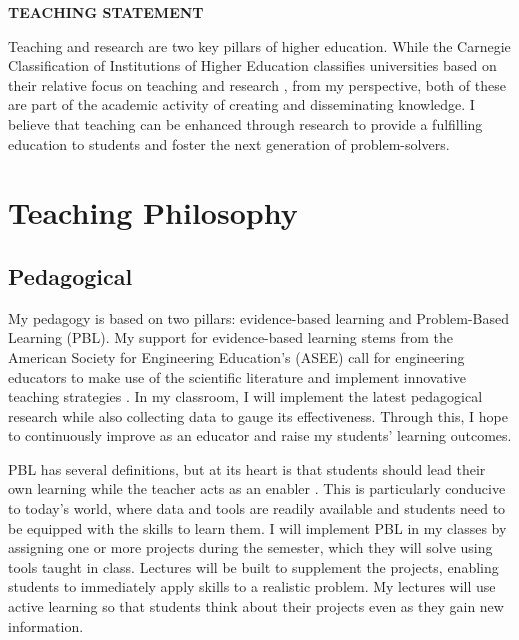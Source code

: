 \documentclass[12pt]{article}
\begin{document}
 \sloppy %
\begin{center}
{\large \uppercase{\textbf{Teaching Statement}}}
\end{center}

Teaching and research are two key pillars of higher education. While the Carnegie Classification of Institutions of Higher Education classifies universities based on their relative focus on teaching and research \cite{carnegie1994classification}, from my perspective, both of these are part of the academic activity of creating and disseminating knowledge. I believe that teaching can be enhanced through research to provide a fulfilling education to students and foster the next generation of problem-solvers.

\section*{Teaching Philosophy}
\subsection*{Pedagogical}
My pedagogy is based on two pillars: evidence-based learning and Problem-Based Learning (PBL). My support for evidence-based learning stems from the American Society for Engineering Education's (ASEE) call for engineering educators to make use of the scientific literature and implement innovative teaching strategies \cite{jamieson2009creating}. In my classroom, I will implement the latest pedagogical research while also collecting data to gauge its effectiveness. Through this, I hope to continuously improve as an educator and raise my students' learning outcomes.

PBL has several definitions, but at its heart is that students should lead their own learning while the teacher acts as an enabler \cite{albanese1993problem}. This is particularly conducive to today's world, where data and tools are readily available and students need to be equipped with the skills to learn them. I will implement PBL in my classes by assigning one or more projects during the semester, which they will solve using tools taught in class. Lectures will be built to supplement the projects, enabling students to immediately apply skills to a realistic problem. My lectures will use active learning so that students think about their projects even as they gain new information.
\end{document}
